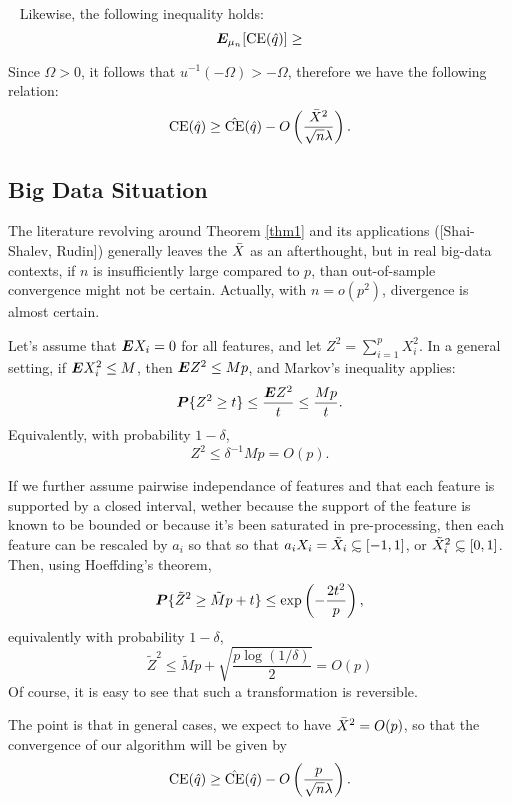 \documentclass{article}
\begin{document}
\begin{thm}\
  \label{thm4}
  Likewise, the following inequality holds:
  \[
    \bm E_{\mu_n}[\operatorname{CE}(\hat q)] \geq 
  \]
\end{thm}

Since $\Omega>0$, it follows that $u^{-1}(-\Omega) > -\Omega$, therefore we have the
following relation:
\[
  \operatorname{CE}(\hat q) \geq \hat{\operatorname{CE}}(\hat q) - O\left(\frac{\bar X^2}{\sqrt{n}\lambda}\right).
\]


\subsection{Big Data Situation}

The literature revolving around Theorem \ref{thm1} and its applications ([Shai-Shalev,
Rudin]) generally leaves the $\bar X$ as an afterthought, but in real big-data contexts, if
$n$ is insufficiently large compared to $p$, than out-of-sample convergence might not be
certain. Actually, with $n=o(p^2)$, divergence is almost certain. 

Let's assume that $\bm E X_i = 0$ for all features, and let $Z^2 = \sum_{i=1}^p X_i^2$. In a
general setting, if $\bm E X_i^2 \leq M$, then $\bm E Z^2 \leq Mp$, and Markov's inequality
applies:
\[
  \bm P\{Z^2 \geq t\} \leq \frac{\bm E Z^2}{t} \leq \frac{Mp}{t}.
\]
Equivalently, with probability $1-\delta$, 
\[
  Z^2 \leq \delta^{-1}Mp = O(p).
\]

If we further assume pairwise independance of features and that each feature is supported
by a closed interval, wether because the support of the feature is known to be bounded or
because it's been saturated in pre-processing, then each feature can be rescaled by $a_i$
so that so that $a_iX_i = \tilde X_i \subsetsim[-1,1]$, or $\tilde X_i^2
\subsetsim[0,1]$. Then, using Hoeffding's theorem,
\[
  \bm P\{\tilde Z^2 \geq \tilde Mp + t\} \leq \exp\left(-\frac{2t^2}{p}\right),
\]
equivalently with probability $1-\delta$, 
\[
  \tilde Z^2 \leq \tilde Mp + \sqrt{\frac{p\log(1/\delta)}{2}} = O(p)
\]
Of course, it is easy to see that such a transformation is reversible. 

The point is that in general cases, we expect to have $\bar X^2 =O(p)$, so that the
convergence of our algorithm will be given by 
\[
  \operatorname{CE}(\hat q) \geq \hat{\operatorname{CE}}(\hat q) - O\left(\frac{p}{\sqrt{n}\lambda}\right).
\]




\end{document}
